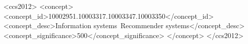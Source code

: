 \documentclass[sigconf]{acmart}
\begin{document}
\begin{CCSXML}
  <ccs2012>
     <concept>
         <concept_id>10002951.10003317.10003347.10003350</concept_id>
         <concept_desc>Information systems~Recommender systems</concept_desc>
         <concept_significance>500</concept_significance>
         </concept>
   </ccs2012>
\end{CCSXML}



\maketitle












\end{document}
